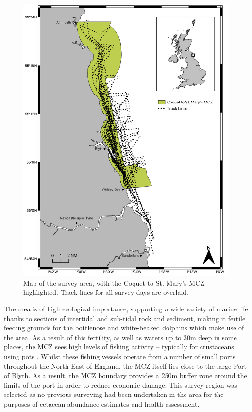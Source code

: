  \begin{figure}
	\begin{center}
		\includegraphics[scale=0.7]{Chapter4/figs/survey_map.pdf}
	\end{center}
	\caption[Map of the survey area, with the Coquet to St. Mary's MCZ highlighted.]{Map of the survey area, with the Coquet to St. Mary's MCZ highlighted. Track lines for all survey days are overlaid.}
	\label{fig:survey-map}
\end{figure}

The area is of high ecological importance, supporting a wide variety of marine life thanks to sections of intertidal and sub-tidal rock and sediment, making it fertile feeding grounds for the bottlenose and white-beaked dolphins which make use of the area. As a result of this fertility, as well as waters up to 30m deep in some places, the MCZ sees high levels of fishing activity -- typically for crustaceans using pots \cite{stephenson_spatial_2017}. Whilst these fishing vessels operate from a number of small ports throughout the North East of England, the MCZ itself lies close to the large Port of Blyth. As a result, the MCZ boundary provides a 250m buffer zone around the limits of the port in order to reduce economic damage. This survey region was selected as no previous surveying had been undertaken in the area for the purposes of cetacean abundance estimates and health assessment.


